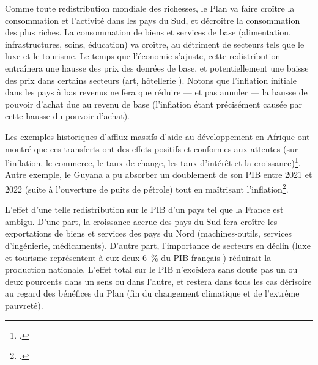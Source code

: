 \documentclass[a5paper,french,openany]{memoir}
\begin{document}
Comme toute redistribution mondiale des richesses, le Plan va faire croître la consommation et l'activité dans les pays du Sud, et décroître la consommation des plus riches. La consommation de biens et services de base (alimentation, infrastructures, soins, éducation) va croître, au détriment de secteurs tels que le luxe et le tourisme. Le temps que l'économie s'ajuste, cette redistribution entraînera une hausse des prix des denrées de base, et potentiellement une baisse des prix dans certains secteurs (art, hôtellerie%
). 
Notons que l'inflation initiale dans les pays à bas revenus ne fera que réduire --- et pas annuler --- la hausse de pouvoir d'achat due au revenu de base (l'inflation étant précisément causée par cette hausse du pouvoir d'achat). 

Les exemples historiques d'afflux massifs d'aide au développement en Afrique ont montré que ces transferts ont des effets positifs et conformes aux attentes (sur l'inflation, le commerce, le taux de change, les taux d'intérêt et la croissance)\footnote{\cite{strand_revenue_2009,berg_macroeconomics_2007}.}. Autre exemple, le Guyana a pu absorber un doublement de son PIB entre 2021 et 2022 (suite à l'ouverture de puits de pétrole) tout en maîtrisant l'inflation\footnote{\citet{fmi_guyana_2023}.}. 

L'effet d'une telle redistribution sur le PIB d'un pays tel que la France est ambigu. D'une part, la croissance accrue des pays du Sud fera croître les exportations de biens et services des pays du Nord (machines-outils, services d'ingénierie, médicaments). 
D'autre part, l'importance de secteurs en déclin (luxe et tourisme représentent à eux deux 6~\% du PIB français%
) réduirait la production nationale. L'effet total sur le PIB n'excèdera sans doute pas un ou deux pourcents dans un sens ou dans l'autre, et restera dans tous les cas dérisoire au regard des bénéfices du Plan (fin du changement climatique et de l'extrême pauvreté). 
\end{document}
